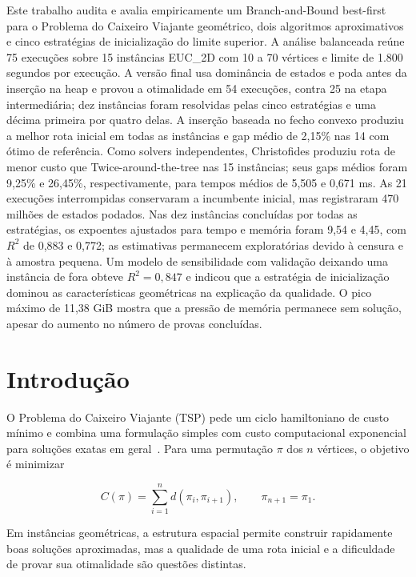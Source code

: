\documentclass[12pt]{article}
\begin{document}
\begin{resumo}
Este trabalho audita e avalia empiricamente um Branch-and-Bound best-first para
o Problema do Caixeiro Viajante geométrico, dois algoritmos aproximativos e
cinco estratégias de inicialização do limite superior. A análise balanceada
reúne 75 execuções sobre 15 instâncias EUC\_2D com 10 a 70 vértices e limite de
1.800 segundos por execução. A versão final usa dominância de estados e poda
antes da inserção na heap e provou a otimalidade em 54 execuções, contra 25 na
etapa intermediária; dez instâncias foram resolvidas pelas cinco
estratégias e uma décima primeira por quatro delas. A inserção baseada no fecho
convexo produziu a melhor rota inicial em todas as instâncias e gap médio de
2,15\% nas 14 com ótimo de referência. Como solvers independentes, Christofides
produziu rota de menor custo que Twice-around-the-tree nas 15 instâncias; seus
gaps médios foram 9,25\% e 26,45\%, respectivamente, para tempos médios de 5,505
e 0,671 ms. As 21 execuções interrompidas conservaram a incumbente inicial, mas
registraram 470 milhões de estados podados. Nas dez instâncias concluídas por
todas as estratégias, os expoentes ajustados para tempo e memória foram 9,54 e
4,45, com $R^2$ de 0,883 e 0,772; as estimativas permanecem exploratórias devido
à censura e à amostra pequena. Um modelo de sensibilidade com validação deixando
uma instância de fora obteve $R^2=0,847$ e indicou que a estratégia de
inicialização dominou as características geométricas na explicação da qualidade.
O pico máximo de 11,38 GiB mostra que a pressão de memória permanece sem solução,
apesar do aumento no número de provas concluídas.
\end{resumo}

\section{Introdução}

O Problema do Caixeiro Viajante (TSP) pede um ciclo hamiltoniano de custo mínimo
e combina uma formulação simples com custo computacional exponencial para
soluções exatas em geral~\cite{applegate2006}. Para uma permutação
$\pi$ dos $n$ vértices, o objetivo é minimizar

\[
  C(\pi)=\sum_{i=1}^{n} d(\pi_i,\pi_{i+1}),
  \qquad \pi_{n+1}=\pi_1.
\]

Em instâncias geométricas, a estrutura espacial permite construir rapidamente
boas soluções aproximadas, mas a qualidade de uma rota inicial e a dificuldade
de provar sua otimalidade são questões distintas.
\end{document}
